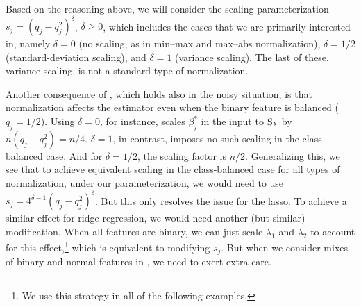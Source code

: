 Based on the reasoning above, we will consider the scaling parameterization \(s_j =
(q_j-q_j^2)^\delta\), \(\delta \geq 0\), which includes the cases that we are primarily
interested in, namely \(\delta = 0\) (no scaling, as in min--max and max--abs
normalization), \(\delta = 1/2\) (standard-deviation scaling), and \(\delta = 1\) (variance
scaling). The last of these, variance scaling, is not a standard type of normalization.

Another consequence of , which holds also in the noisy
situation, is that normalization affects the estimator even when the binary feature is
balanced (\(q_j = 1/2\)). Using \(\delta = 0\), for instance, scales \(\beta_j^*\) in the
input to \(\operatorname{S}_\lambda\) by \(n (q_j - q_j^2) = n/4\). \(\delta = 1\), in contrast, imposes
no such scaling in the class-balanced case. And for \(\delta = 1/2\), the scaling factor is
\(n/2\). Generalizing this, we see that to achieve equivalent scaling in the class-balanced
case for all types of normalization, under our parameterization, we would need to use \(s_j
= 4^{\delta - 1} (q_j - q_j^2)^\delta\). But this only resolves the issue for the lasso. To
achieve a similar effect for ridge regression, we would need another (but similar)
modification. When all features are binary, we can just scale \(\lambda_1\) and
\(\lambda_2\) to account for this effect,\footnote{We use this strategy in all of the
  following examples.} which is equivalent to modifying \(s_j\). But when we consider mixes
of binary and normal features in , we need to exert extra care.

